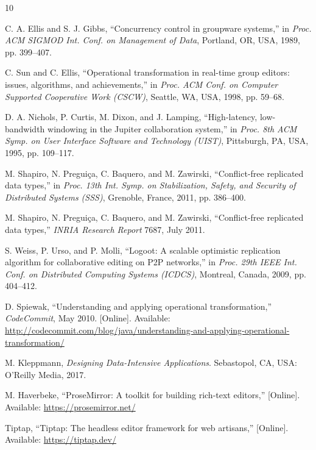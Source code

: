 \documentclass[conference]{IEEEtran}
\begin{document}

\begin{thebibliography}{10}

C. A. Ellis and S. J. Gibbs, ``Concurrency control in groupware systems,'' in \emph{Proc. ACM SIGMOD Int. Conf. on Management of Data}, Portland, OR, USA, 1989, pp. 399--407.

C. Sun and C. Ellis, ``Operational transformation in real-time group editors: issues, algorithms, and achievements,'' in \emph{Proc. ACM Conf. on Computer Supported Cooperative Work (CSCW)}, Seattle, WA, USA, 1998, pp. 59--68.

D. A. Nichols, P. Curtis, M. Dixon, and J. Lamping, ``High-latency, low-bandwidth windowing in the Jupiter collaboration system,'' in \emph{Proc. 8th ACM Symp. on User Interface Software and Technology (UIST)}, Pittsburgh, PA, USA, 1995, pp. 109--117.

M. Shapiro, N. Pregui{\c{c}}a, C. Baquero, and M. Zawirski, ``Conflict-free replicated data types,'' in \emph{Proc. 13th Int. Symp. on Stabilization, Safety, and Security of Distributed Systems (SSS)}, Grenoble, France, 2011, pp. 386--400.

M. Shapiro, N. Pregui{\c{c}}a, C. Baquero, and M. Zawirski, ``Conflict-free replicated data types,'' \emph{INRIA Research Report} 7687, July 2011.

S. Weiss, P. Urso, and P. Molli, ``Logoot: A scalable optimistic replication algorithm for collaborative editing on P2P networks,'' in \emph{Proc. 29th IEEE Int. Conf. on Distributed Computing Systems (ICDCS)}, Montreal, Canada, 2009, pp. 404--412.

D. Spiewak, ``Understanding and applying operational transformation,'' \emph{CodeCommit}, May 2010. [Online]. Available: \url{http://codecommit.com/blog/java/understanding-and-applying-operational-transformation/}

M. Kleppmann, \emph{Designing Data-Intensive Applications}. Sebastopol, CA, USA: O'Reilly Media, 2017.

M. Haverbeke, ``ProseMirror: A toolkit for building rich-text editors,'' [Online]. Available: \url{https://prosemirror.net/}

Tiptap, ``Tiptap: The headless editor framework for web artisans,'' [Online]. Available: \url{https://tiptap.dev/}

\end{thebibliography}
\end{document}
